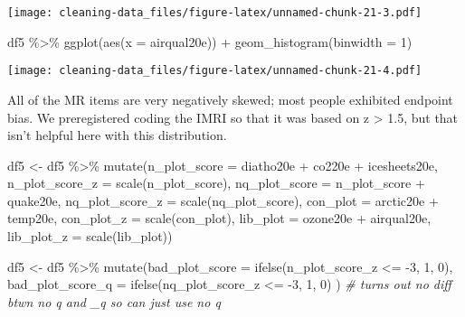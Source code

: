 \documentclass[
]{article}
\newenvironment{Shaded}{\begin{snugshade}}{\end{snugshade}}
\newcommand{\AttributeTok}[1]{\textcolor[rgb]{0.77,0.63,0.00}{#1}}
\newcommand{\CommentTok}[1]{\textcolor[rgb]{0.56,0.35,0.01}{\textit{#1}}}
\newcommand{\DecValTok}[1]{\textcolor[rgb]{0.00,0.00,0.81}{#1}}
\newcommand{\FunctionTok}[1]{\textcolor[rgb]{0.00,0.00,0.00}{#1}}
\newcommand{\NormalTok}[1]{#1}
\newcommand{\OtherTok}[1]{\textcolor[rgb]{0.56,0.35,0.01}{#1}}
\newcommand{\SpecialCharTok}[1]{\textcolor[rgb]{0.00,0.00,0.00}{#1}}
\begin{document}
\texttt{[image: cleaning-data\_files/figure-latex/unnamed-chunk-21-3.pdf]}

\begin{Shaded}
\begin{Highlighting}[]
\NormalTok{df5 }\SpecialCharTok{\%\textgreater{}\%}
  \FunctionTok{ggplot}\NormalTok{(}\FunctionTok{aes}\NormalTok{(}\AttributeTok{x =}\NormalTok{ airqual20e)) }\SpecialCharTok{+}
  \FunctionTok{geom\_histogram}\NormalTok{(}\AttributeTok{binwidth =} \DecValTok{1}\NormalTok{)}
\end{Highlighting}
\end{Shaded}

\texttt{[image: cleaning-data\_files/figure-latex/unnamed-chunk-21-4.pdf]}

All of the MR items are very negatively skewed; most people exhibited
endpoint bias. We preregistered coding the IMRI so that it was based on
z \textgreater{} 1.5, but that isn't helpful here with this
distribution.

\begin{Shaded}
\begin{Highlighting}[]
\NormalTok{df5 }\OtherTok{\textless{}{-}}\NormalTok{ df5 }\SpecialCharTok{\%\textgreater{}\%} 
  \FunctionTok{mutate}\NormalTok{(}\AttributeTok{n\_plot\_score =}\NormalTok{ diatho20e }\SpecialCharTok{+}\NormalTok{ co220e }\SpecialCharTok{+}\NormalTok{ icesheets20e,}
         \AttributeTok{n\_plot\_score\_z =} \FunctionTok{scale}\NormalTok{(n\_plot\_score),}
         \AttributeTok{nq\_plot\_score =}\NormalTok{ n\_plot\_score }\SpecialCharTok{+}\NormalTok{ quake20e, }
         \AttributeTok{nq\_plot\_score\_z =} \FunctionTok{scale}\NormalTok{(nq\_plot\_score),}
         \AttributeTok{con\_plot =}\NormalTok{ arctic20e }\SpecialCharTok{+}\NormalTok{ temp20e,}
         \AttributeTok{con\_plot\_z =} \FunctionTok{scale}\NormalTok{(con\_plot),}
         \AttributeTok{lib\_plot =}\NormalTok{ ozone20e }\SpecialCharTok{+}\NormalTok{ airqual20e,}
         \AttributeTok{lib\_plot\_z =} \FunctionTok{scale}\NormalTok{(lib\_plot))}

\NormalTok{df5 }\OtherTok{\textless{}{-}}\NormalTok{ df5 }\SpecialCharTok{\%\textgreater{}\%} 
  \FunctionTok{mutate}\NormalTok{(}\AttributeTok{bad\_plot\_score =} \FunctionTok{ifelse}\NormalTok{(n\_plot\_score\_z }\SpecialCharTok{\textless{}=} \SpecialCharTok{{-}}\DecValTok{3}\NormalTok{, }\DecValTok{1}\NormalTok{, }\DecValTok{0}\NormalTok{),}
         \AttributeTok{bad\_plot\_score\_q =} \FunctionTok{ifelse}\NormalTok{(nq\_plot\_score\_z }\SpecialCharTok{\textless{}=} \SpecialCharTok{{-}}\DecValTok{3}\NormalTok{, }\DecValTok{1}\NormalTok{, }\DecValTok{0}\NormalTok{)}
\NormalTok{         ) }\CommentTok{\# turns out no diff btwn no q and \_q so can just use no q}
\end{Highlighting}
\end{Shaded}
\end{document}
